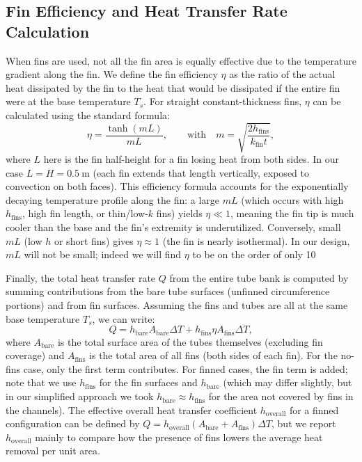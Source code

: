 \documentclass[12pt]{article}
\begin{document}
\subsection{Fin Efficiency and Heat Transfer Rate Calculation}
When fins are used, not all the fin area is equally effective due to the temperature gradient along the fin. We define the fin efficiency $\eta$ as the ratio of the actual heat dissipated by the fin to the heat that would be dissipated if the entire fin were at the base temperature $T_s$. For straight constant-thickness fins, $\eta$ can be calculated using the standard formula:
\begin{equation}
\eta = \frac{\tanh(m L)}{m L}, \qquad \text{with} \quad m = \sqrt{\frac{2 h_{\text{fins}}}{k_{\text{fin}} t}},
\label{eq:eta}
\end{equation}
where $L$ here is the fin half-height for a fin losing heat from both sides. In our case $L = H = 0.5~\text{m}$ (each fin extends that length vertically, exposed to convection on both faces). This efficiency formula accounts for the exponentially decaying temperature profile along the fin: a large $mL$ (which occurs with high $h_{\text{fins}}$, high fin length, or thin/low-$k$ fins) yields $\eta \ll 1$, meaning the fin tip is much cooler than the base and the fin’s extremity is underutilized. Conversely, small $mL$ (low $h$ or short fins) gives $\eta \approx 1$ (the fin is nearly isothermal). In our design, $mL$ will not be small; indeed we will find $\eta$ to be on the order of only 10%

Finally, the total heat transfer rate $Q$ from the entire tube bank is computed by summing contributions from the bare tube surfaces (unfinned circumference portions) and from fin surfaces. Assuming the fins and tubes are all at the same base temperature $T_s$, we can write:
\begin{equation}
Q = h_{\text{bare}} A_{\text{bare}} \Delta T + h_{\text{fins}} \eta A_{\text{fins}} \Delta T,
\label{eq:Q}
\end{equation}
where $A_{\text{bare}}$ is the total surface area of the tubes themselves (excluding fin coverage) and $A_{\text{fins}}$ is the total area of all fins (both sides of each fin). For the no-fins case, only the first term contributes. For finned cases, the fin term is added; note that we use $h_{\text{fins}}$ for the fin surfaces and $h_{\text{bare}}$ (which may differ slightly, but in our simplified approach we took $h_{\text{bare}} \approx h_{\text{fins}}$ for the area not covered by fins in the channels). The effective overall heat transfer coefficient $h_{\text{overall}}$ for a finned configuration can be defined by $Q = h_{\text{overall}} (A_{\text{bare}}+A_{\text{fins}}) \Delta T$, but we report $h_{\text{overall}}$ mainly to compare how the presence of fins lowers the average heat removal per unit area.
\end{document}
